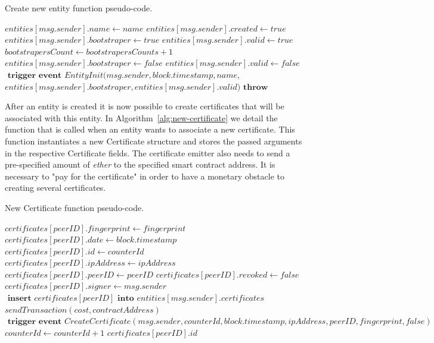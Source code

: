 \begin{algorithm}[h!]
  \caption{Create new entity function pseudo-code.}
  \label{alg:create-entity}
  \begin{algorithmic}[1]
        \State $entities[msg.sender].name \gets name$
        \State $entities[msg.sender].created \gets true$
        \State
          \State $entities[msg.sender].bootstraper \gets  true$
          \State $entities[msg.sender].valid \gets true$
          \State $bootstrapersCount \gets bootstrapersCounts + 1$
        \Else
          \State $entities[msg.sender].bootstraper \gets  false$
          \State $entities[msg.sender].valid \gets false$
        \EndIf
          \State
          \State $\textbf{ trigger event } EntityInit(msg.sender, block.timestamp, name,$
          \State $entities[msg.sender].bootstraper, entities[msg.sender].valid)$
      \Else
        \State $\textbf{throw}$
      \EndIf
    \EndFunction
  \end{algorithmic}
\end{algorithm}


After an entity is created it is now possible to create certificates that will be associated with this entity.
In Algorithm~\ref{alg:new-certificate} we detail the function that is called when an entity wants to associate a new certificate.
This function instantiates a new Certificate structure and stores the passed arguments in the respective Certificate fields.
The certificate emitter also needs to send a pre-specified amount of \textit{ether} to the specified smart contract address.
It is necessary to "pay for the certificate" in order to have a monetary obstacle to creating several certificates.

\begin{algorithm}[h!]
  \caption{New Certificate function pseudo-code.}
\label{alg:new-certificate}
  \begin{algorithmic}[1]
      \State $certificates[peerID].fingerprint \gets fingerprint$
      \State $certificates[peerID].date \gets block.timestamp$
      \State $certificates[peerID].id \gets counterId$
      \State $certificates[peerID].ipAddress \gets ipAddress$
      \State $certificates[peerID].peerID \gets peerID$
      \State $certificates[peerID].revoked \gets false$
      \State $certificates[peerID].signer \gets msg.sender$
      \State 
      \State $\textbf{ insert } certificates[peerID] \textbf{ into } entities[msg.sender].certificates$
      \State $sendTransaction(cost, contractAddress)$ 
      \State 
      \State $\textbf{ trigger event } CreateCertificate(msg.sender, counterId, block.timestamp,\allowbreak ipAddress, peerID, fingerprint, false)$
      \State
      \State $counterId \gets counterId + 1$
      \State 
      \State 
      \Return $certificates[peerID].id$
    \EndFunction
  \end{algorithmic}
\end{algorithm}


